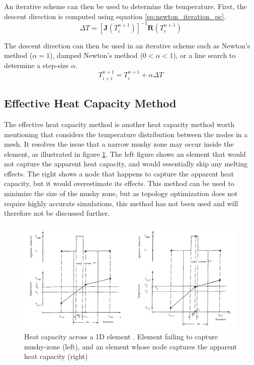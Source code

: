 An iterative scheme can then be used to determine the temperature. First, the descent direction is computed using equation \ref{eq:newton_iteration_pc}.
\begin{equation}
    \Delta T = [\mathbf{J}(T_i^{n+1})]^{-1}\mathbf{R}(T_i^{n+1})
    \label{eq:newton_iteration_pc}
\end{equation}

The descent direction can then be used in an iterative scheme such as Newton's method ($\alpha = 1$), damped Newton's method ($0<\alpha<1$), or a line search to determine a step-size $\alpha$.
\begin{equation}
    T_{i+1}^{n+1} = T_{i}^{n+1} + \alpha\Delta T
\end{equation}

\subsection*{Effective Heat Capacity Method}
The effective heat capacity method \cite{Poirier_Salcudean_1988} is another heat capacity method worth mentioning that considers the temperature distribution between the nodes in a mesh. It resolves the issue that a narrow mushy zone may occur inside the element, as illustrated in figure \ref{fig:effective_heat_capacity_method}. The left figure shows an element that would not capture the apparent heat capacity, and would essentially skip any melting effects. The right shows a node that happens to capture the apparent heat capacity, but it would overestimate its effects. This method can be used to minimize the size of the mushy zone, but as topology optimization does not require highly accurate simulations, this method has not been used and will therefore not be discussed further.
\begin{figure}[ht]
    \centering
    \includegraphics[width=.7\linewidth]{figures/chapter_3/EffectiveHeatCapacity.png}
    \caption{Heat capacity across a 1D element \cite{Poirier_Salcudean_1988}. Element failing to capture mushy-zone (left), and an element whose node captures the apparent heat capacity (right)}
    \label{fig:effective_heat_capacity_method}
\end{figure}
